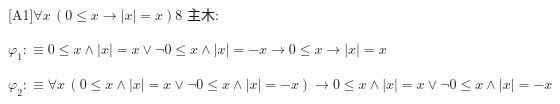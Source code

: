 \begin{fullproof}{[A1]}{$\forall x\,(0 \leq x \to \lvert x \rvert = x)$}{8}\label{tree:AbsOfNonneg}
\noindent 主木:
\begin{ptree}
\end{ptree}
\begin{abbrevlist}
\item $\varphi_{1} :\equiv 0 \leq x \land \lvert x \rvert = x \lor \neg 0 \leq x \land \lvert x \rvert = -x \to 0 \leq x \to \lvert x \rvert = x$
\item $\varphi_{2} :\equiv \forall x\,(0 \leq x \land \lvert x \rvert = x \lor \neg 0 \leq x \land \lvert x \rvert = -x) \to 0 \leq x \land \lvert x \rvert = x \lor \neg 0 \leq x \land \lvert x \rvert = -x$
\end{abbrevlist}
\end{fullproof}
